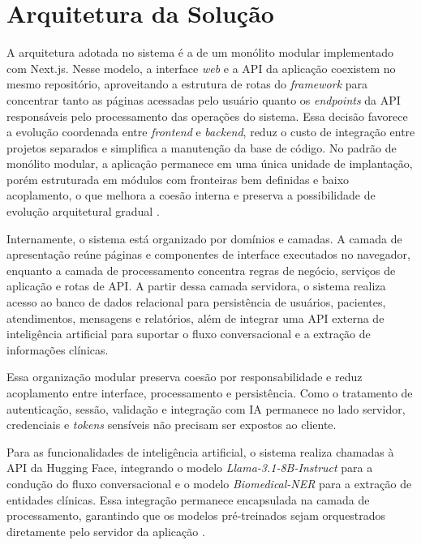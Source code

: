 \section{Arquitetura da Solução}

A arquitetura adotada no sistema é a de um monólito modular implementado com Next.js. Nesse
modelo, a interface \textit{web} e a API da aplicação coexistem no mesmo repositório, aproveitando a
estrutura de rotas do \textit{framework} para concentrar tanto as páginas acessadas pelo usuário quanto os
\textit{endpoints} da API responsáveis pelo processamento das operações do sistema. Essa decisão favorece a
evolução coordenada entre \textit{frontend} e \textit{backend}, reduz o custo de integração entre projetos
separados e simplifica a manutenção da base de código. No padrão de monólito modular, a aplicação
permanece em uma única unidade de implantação, porém estruturada em módulos com fronteiras bem
definidas e baixo acoplamento, o que melhora a coesão interna e preserva a possibilidade de
evolução arquitetural gradual \cite{jovanovic2024,nextjsroutehandlers2026}.

Internamente, o sistema está organizado por domínios e camadas. A camada de apresentação reúne
páginas e componentes de interface executados no navegador, enquanto a camada de processamento
concentra regras de negócio, serviços de aplicação e rotas de API. A partir dessa camada
servidora, o sistema realiza acesso ao banco de dados relacional para persistência de usuários,
pacientes, atendimentos, mensagens e relatórios, além de integrar uma API externa de inteligência
artificial para suportar o fluxo conversacional e a extração de informações clínicas.

Essa organização modular preserva coesão por responsabilidade e reduz acoplamento entre interface,
processamento e persistência. Como o tratamento de autenticação, sessão, validação e integração
com IA permanece no lado servidor, credenciais e \textit{tokens} sensíveis não precisam ser expostos ao
cliente. 

Para as funcionalidades de inteligência artificial, o sistema realiza chamadas à API da Hugging Face, 
integrando o modelo \textit{Llama-3.1-8B-Instruct} para a condução do fluxo conversacional e o 
modelo \textit{Biomedical-NER} para a extração de entidades clínicas. Essa integração permanece 
encapsulada na camada de processamento, garantindo que os modelos pré-treinados sejam orquestrados 
diretamente pelo servidor da aplicação \cite{huggingface2024}.

